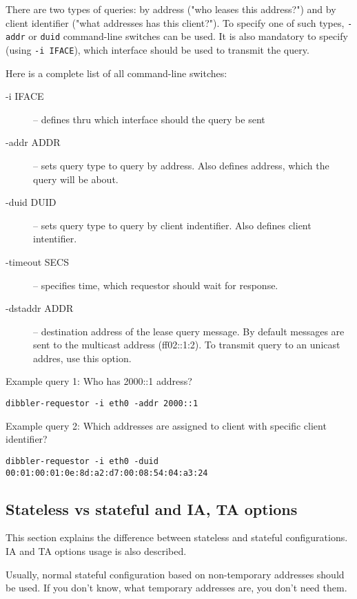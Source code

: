 There are two types of queries: by address ("who leases this address?")
and by client identifier ("what addresses has this client?"). To specify
one of such types, \verb+-addr+ or \verb+duid+ command-line switches
can be used. It is also mandatory to specify (using \verb+-i IFACE+),
which interface should be used to transmit the query.

Here is a complete list of all command-line switches:

\begin{description}
\item[-i IFACE] -- defines thru which interface should the query be sent
\item[-addr ADDR] -- sets query type to query by address. Also defines
  address, which the query will be about.
\item[-duid DUID] -- sets query type to query by client
  indentifier. Also defines client intentifier.
\item[-timeout SECS] -- specifies time, which requestor should wait
  for response.
\item[-dstaddr ADDR] -- destination address of the lease query
  message. By default messages are sent to the multicast address
  (ff02::1:2). To transmit query to an unicast addres, use this option.
\end{description}

Example query 1: Who has 2000::1 address?

\begin{lstlisting}
dibbler-requestor -i eth0 -addr 2000::1
\end{lstlisting}

Example query 2: Which addresses are assigned to client with specific
client identifier?

\begin{lstlisting}
dibbler-requestor -i eth0 -duid 00:01:00:01:0e:8d:a2:d7:00:08:54:04:a3:24
\end{lstlisting}

\subsection{Stateless vs stateful and IA, TA options}
\label{feature-stateless-stateful}
This section explains the difference between stateless and stateful
configurations. IA and TA options usage is also described.

Usually, normal stateful configuration based on non-temporary
addresses should be used. If you don't know, what temporary addresses
are, you don't need them.

